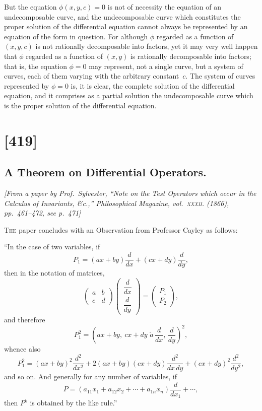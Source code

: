 \documentclass[11pt,a4paper]{article}
\theoremstyle{plain}
\theoremstyle{definition}
\begin{document}
But the equation $\phi(x,y,c)=0$ is not of necessity the equation of an undecomposable
curve, and the undecomposable curve which constitutes the proper solution of
the differential equation cannot always be represented by an equation of the form in
question.  For although $\phi$ regarded as a function of $(x,y,c)$ is not rationally
decomposable into factors, yet it may very well happen that $\phi$ regarded as a
function of $(x,y)$ is rationally decomposable into factors; that is, the equation
$\phi=0$ may represent, not a single curve, but a system of curves, each of them
varying with the arbitrary constant~$c$.  The system of curves represented by
$\phi=0$ is, it is clear, the complete solution of the differential equation, and it
comprises as a partial solution the undecomposable curve which is the proper solution
of the differential equation.

\clearpage

\section{[419]}
\subsection{A Theorem on Differential Operators.}

\begin{center}
\textit{[From a paper by Prof.\ Sylvester, ``Note on the Test Operators which occur in the
Calculus of Invariants, \&c.,'' Philosophical Magazine, vol.~\textsc{xxxii}. (1866),
pp.~461--472, see p.~471]}
\end{center}

\textsc{The} paper concludes with an Observation from Professor Cayley as follows:

``In the case of two variables, if
\[
P_1 = \left(ax + by\right)\frac{d}{dx} + \left(cx + dy\right)\frac{d}{dy},
\]
then in the notation of matrices,
\[
\begin{pmatrix} a & b \\ c & d \end{pmatrix}
\begin{pmatrix} \dfrac{d}{dx} \\[6pt] \dfrac{d}{dy} \end{pmatrix}
=
\begin{pmatrix} P_1 \\ P_2 \end{pmatrix},
\]
and therefore
\[
P_1^2 = \left(ax+by,\ cx+dy\,\,\check{a}\,\frac{d}{dx},\,\frac{d}{dy}\right)^2,
\]
whence also
\[
P_1^2 = (ax+by)^2\frac{d^2}{dx^2} + 2(ax+by)(cx+dy)\frac{d^2}{dx\,dy} + (cx+dy)^2\frac{d^2}{dy^2},
\]
and so on.  And generally for any number of variables, if
\[
P = (a_{11}x_1 + a_{12}x_2 + \cdots + a_{1n}x_n)\frac{d}{dx_1} + \cdots,
\]
then $P^k$ is obtained by the like rule.''
\end{document}
